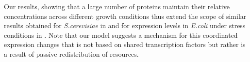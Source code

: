 Our results, showing that a large number of proteins maintain their relative concentrations across different growth conditions thus extend the scope of similar results obtained for \emph{S.cerevisiae} in \cite{Keren2013a} and for expression levels in \emph{E.coli} under stress conditions in \cite{Kaneko2014}.
Note that our model suggests a mechanism for this coordinated expression changes that is not based on shared transcription factors but rather is a result of passive redistribution of resources.